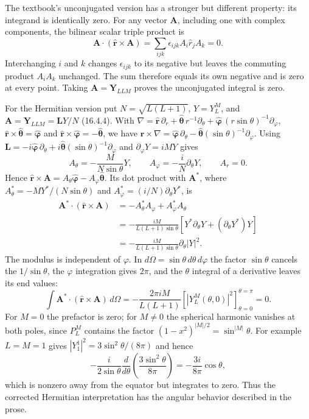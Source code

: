 The textbook's unconjugated version has a stronger but different
property: its integrand is identically zero.
For any vector $\mathbf A$, including one with complex components,
the bilinear scalar triple product is
\[
\mathbf A\cdot(\hat{\mathbf r}\times\mathbf A)
=\sum_{ijk}\epsilon_{ijk}A_i\hat r_jA_k=0.
\]
Interchanging $i$ and $k$ changes $\epsilon_{ijk}$ to its negative
but leaves the commuting product $A_iA_k$ unchanged. The sum
therefore equals its own negative and is zero at every point.
Taking $\mathbf A=\mathbf Y_{LLM}$ proves the unconjugated integral
is zero.

For the Hermitian version put $N=\sqrt{L(L+1)}$, $Y=Y_L^M$, and
$\mathbf A=\mathbf Y_{LLM}=\mathbf LY/N$ (16.4.4). With
$\nabla=\hat{\mathbf r}\,\partial_r+\hat{\boldsymbol\theta}\,r^{-1}
\partial_\theta+\hat{\boldsymbol\varphi}\,(r\sin\theta)^{-1}
\partial_\varphi$,
$\hat{\mathbf r}\times\hat{\boldsymbol\theta}
=\hat{\boldsymbol\varphi}$ and
$\hat{\mathbf r}\times\hat{\boldsymbol\varphi}
=-\hat{\boldsymbol\theta}$, we have
$\mathbf r\times\nabla=\hat{\boldsymbol\varphi}\,\partial_\theta
-\hat{\boldsymbol\theta}(\sin\theta)^{-1}\partial_\varphi$.
Using $\mathbf L=-i\hat{\boldsymbol\varphi}\,\partial_\theta
+i\hat{\boldsymbol\theta}(\sin\theta)^{-1}\partial_\varphi$ and
$\partial_\varphi Y=iMY$ gives
\[
A_\theta=-\frac{M}{N\sin\theta}Y,\qquad
A_\varphi=-\frac{i}{N}\partial_\theta Y,\qquad A_r=0.
\]
Hence $\hat{\mathbf r}\times\mathbf A
=A_\theta\hat{\boldsymbol\varphi}-A_\varphi\hat{\boldsymbol\theta}$.
Its dot product with $\mathbf A^*$, where
$A_\theta^*=-MY^*/(N\sin\theta)$ and
$A_\varphi^*=(i/N)\partial_\theta Y^*$, is
\[
\begin{aligned}
\mathbf A^*\cdot(\hat{\mathbf r}\times\mathbf A)
&=-A_\theta^*A_\varphi+A_\varphi^*A_\theta\\
&=-\frac{iM}{L(L+1)\sin\theta}
\left[Y^*\partial_\theta Y+
(\partial_\theta Y^*)Y\right]\\
&=-\frac{iM}{L(L+1)\sin\theta}\partial_\theta|Y|^2.
\end{aligned}
\]
The modulus is independent of $\varphi$. In
$d\Omega=\sin\theta\,d\theta\,d\varphi$ the factor $\sin\theta$
cancels the $1/\sin\theta$, the $\varphi$ integration gives $2\pi$,
and the $\theta$ integral of a derivative leaves its end values:
\[
\int\mathbf A^*\cdot(\hat{\mathbf r}\times\mathbf A)\,d\Omega
=-\frac{2\pi iM}{L(L+1)}
\left[|Y_L^M(\theta,0)|^2\right]_{\theta=0}^{\theta=\pi}=0.
\]
For $M=0$ the prefactor is zero; for $M\ne0$ the spherical
harmonic vanishes at both poles, since $P_L^M$ contains the factor
$(1-x^2)^{|M|/2}=\sin^{|M|}\theta$. For example $L=M=1$ gives
$|Y_1^1|^2=3\sin^2\theta/(8\pi)$ and hence
\[
-\frac{i}{2\sin\theta}\frac{d}{d\theta}
\left(\frac{3\sin^2\theta}{8\pi}\right)
=-\frac{3i}{8\pi}\cos\theta,
\]
which is nonzero away from the equator but integrates to zero. Thus the corrected
Hermitian interpretation has the angular behavior described
in the prose.

